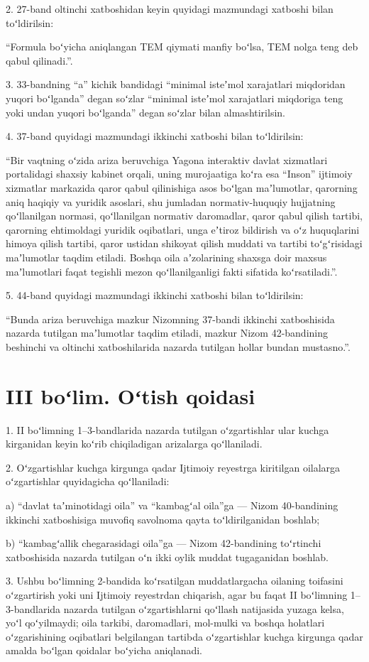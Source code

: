 \documentclass[14pt,a4paper]{extarticle}
\newcommand{\norm}[1]{\par\noindent\hspace*{1.27cm}#1. }
\newcommand{\sub}[1]{\par\noindent\hspace*{1.27cm}#1 }
\begin{document}
\norm{2}27-band oltinchi xatboshidan keyin quyidagi mazmundagi xatboshi bilan toʻldirilsin:

“Formula boʻyicha aniqlangan TEM qiymati manfiy boʻlsa, TEM nolga teng deb qabul qilinadi.”.

\norm{3}33-bandning “a” kichik bandidagi “minimal isteʼmol xarajatlari miqdoridan yuqori boʻlganda” degan soʻzlar “minimal isteʼmol xarajatlari miqdoriga teng yoki undan yuqori boʻlganda” degan soʻzlar bilan almashtirilsin.

\norm{4}37-band quyidagi mazmundagi ikkinchi xatboshi bilan toʻldirilsin:

“Bir vaqtning oʻzida ariza beruvchiga Yagona interaktiv davlat xizmatlari portalidagi shaxsiy kabinet orqali, uning murojaatiga koʻra esa “Inson” ijtimoiy xizmatlar markazida qaror qabul qilinishiga asos boʻlgan maʼlumotlar, qarorning aniq haqiqiy va yuridik asoslari, shu jumladan normativ-huquqiy hujjatning qoʻllanilgan normasi, qoʻllanilgan normativ daromadlar, qaror qabul qilish tartibi, qarorning ehtimoldagi yuridik oqibatlari, unga eʼtiroz bildirish va oʻz huquqlarini himoya qilish tartibi, qaror ustidan shikoyat qilish muddati va tartibi toʻgʻrisidagi maʼlumotlar taqdim etiladi. Boshqa oila aʼzolarining shaxsga doir maxsus maʼlumotlari faqat tegishli mezon qoʻllanilganligi fakti sifatida koʻrsatiladi.”.

\norm{5}44-band quyidagi mazmundagi ikkinchi xatboshi bilan toʻldirilsin:

“Bunda ariza beruvchiga mazkur Nizomning 37-bandi ikkinchi xatboshisida nazarda tutilgan maʼlumotlar taqdim etiladi, mazkur Nizom 42-bandining beshinchi va oltinchi xatboshilarida nazarda tutilgan hollar bundan mustasno.”.
\section*{III boʻlim. Oʻtish qoidasi}

\norm{1}II boʻlimning 1–3-bandlarida nazarda tutilgan oʻzgartishlar ular kuchga kirganidan keyin koʻrib chiqiladigan arizalarga qoʻllaniladi.

\norm{2}Oʻzgartishlar kuchga kirgunga qadar Ijtimoiy reyestrga kiritilgan oilalarga oʻzgartishlar quyidagicha qoʻllaniladi:
\sub{a)}“davlat taʼminotidagi oila” va “kambagʻal oila”ga — Nizom 40-bandining ikkinchi xatboshisiga muvofiq savolnoma qayta toʻldirilganidan boshlab;
\sub{b)}“kambagʻallik chegarasidagi oila”ga — Nizom 42-bandining toʻrtinchi xatboshisida nazarda tutilgan oʻn ikki oylik muddat tugaganidan boshlab.

\norm{3}Ushbu boʻlimning 2-bandida koʻrsatilgan muddatlargacha oilaning toifasini oʻzgartirish yoki uni Ijtimoiy reyestrdan chiqarish, agar bu faqat II boʻlimning 1–3-bandlarida nazarda tutilgan oʻzgartishlarni qoʻllash natijasida yuzaga kelsa, yoʻl qoʻyilmaydi; oila tarkibi, daromadlari, mol-mulki va boshqa holatlari oʻzgarishining oqibatlari belgilangan tartibda oʻzgartishlar kuchga kirgunga qadar amalda boʻlgan qoidalar boʻyicha aniqlanadi.
\end{document}
